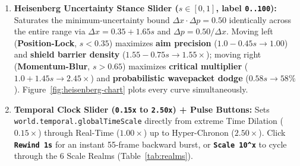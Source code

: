 \documentclass[10pt,letterpaper]{article}
\begin{document}
\begin{enumerate}[leftmargin=1.5em, itemsep=2pt]
  \item \textbf{Heisenberg Uncertainty Stance Slider ($s \in [0, 1]$, label \texttt{0..100}):} Saturates the minimum-uncertainty bound $\Delta x \cdot \Delta p = 0.50$ identically across the entire range via $\Delta x = 0.35 + 1.65s$ and $\Delta p = 0.50 / \Delta x$. Moving left (\textbf{Position-Lock}, $s < 0.35$) maximizes \textbf{aim precision} ($1.0 - 0.45s \to 1.00$) and \textbf{shield barrier density} ($1.55 - 0.75s \to 1.55\times$); moving right (\textbf{Momentum-Blur}, $s > 0.65$) maximizes \textbf{critical multiplier} ($1.0 + 1.45s \to 2.45\times$) and \textbf{probabilistic wavepacket dodge} ($0.58s \to 58\%$). Figure~\ref{fig:heisenberg-chart} plots every curve simultaneously.
  \item \textbf{Temporal Clock Slider (\texttt{0.15x} to \texttt{2.50x}) + Pulse Buttons:} Sets \nolinkurl{world.temporal.globalTimeScale} directly from extreme Time Dilation ($0.15\times$) through Real-Time ($1.00\times$) up to Hyper-Chronon ($2.50\times$). Click \textbf{\texttt{Rewind 1s}} for an instant 55-frame backward burst, or \textbf{\texttt{Scale 10\^{}x}} to cycle through the 6 Scale Realms (Table~\ref{tab:realms}).
\end{enumerate}
\end{document}
